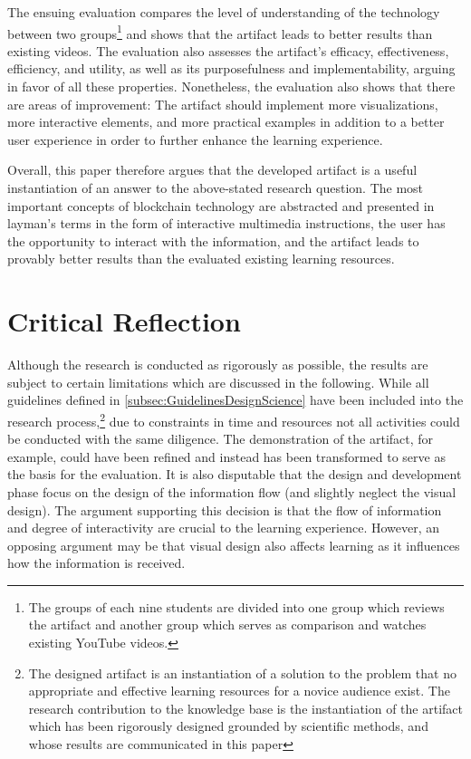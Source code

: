 The ensuing evaluation compares the level of understanding of the technology between two groups\footnote{The groups of each nine students are divided into one group which reviews the artifact and another group which serves as comparison and watches existing YouTube videos.} and shows that the artifact leads to better results than existing videos. The evaluation also assesses the artifact's efficacy, effectiveness, efficiency, and utility, as well as its purposefulness and implementability, arguing in favor of all these properties. Nonetheless, the evaluation also shows that there are areas of improvement: The artifact should implement more visualizations, more interactive elements, and more practical examples in addition to a better user experience in order to further enhance the learning experience.

Overall, this paper therefore argues that the developed artifact is a useful instantiation of an answer to the above-stated research question. The most important concepts of blockchain technology are abstracted and presented in layman's terms in the form of interactive multimedia instructions, the user has the opportunity to interact with the information, and the artifact leads to provably better results than the evaluated existing learning resources.

\section{Critical Reflection} \label{sec:Reflection}
Although the research is conducted as rigorously as possible, the results are subject to certain limitations which are discussed in the following. 
While all guidelines defined in \ref{subsec:GuidelinesDesignScience} have been included into the research process,\footnote{The designed artifact is an instantiation of a solution to the problem that no appropriate and effective learning resources for a novice audience exist. The research contribution to the knowledge base is the instantiation of the artifact which has been rigorously designed grounded by scientific methods, and whose results are communicated in this paper} due to constraints in time and resources not all activities could be conducted with the same diligence. The demonstration of the artifact, for example, could have been refined and instead has been transformed to serve as the basis for the evaluation. It is also disputable that the design and development phase focus on the design of the information flow (and slightly neglect the visual design). The argument supporting this decision is that the flow of information and degree of interactivity are crucial to the learning experience. However, an opposing argument may be that visual design also affects learning as it influences how the information is received.

